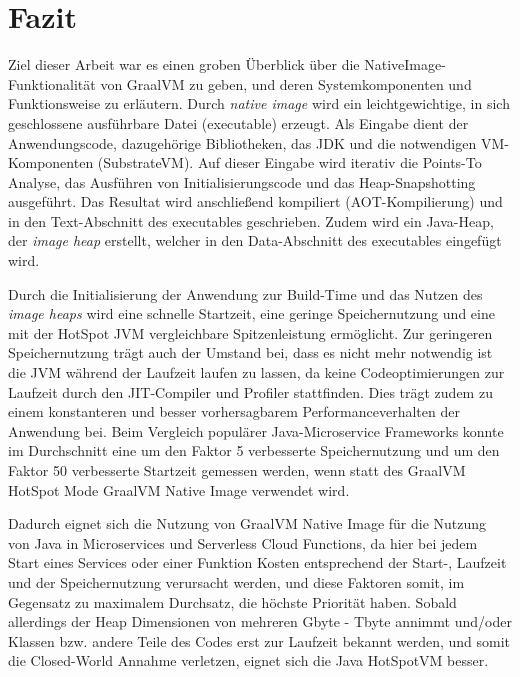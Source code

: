 \section{Fazit}
\label{sec:fazit}

Ziel dieser Arbeit war es einen groben Überblick über die NativeImage-Funktionalität von GraalVM zu geben, und deren Systemkomponenten und Funktionsweise zu erläutern. 
Durch \textit{native image} wird ein leichtgewichtige, in sich geschlossene ausführbare Datei (executable) erzeugt. Als Eingabe dient der Anwendungscode, dazugehörige Bibliotheken, das JDK und 
die notwendigen VM-Komponenten (SubstrateVM). Auf dieser Eingabe wird iterativ die Points-To Analyse, das Ausführen
von Initialisierungscode und das Heap-Snapshotting ausgeführt. Das Resultat wird anschließend kompiliert (AOT-Kompilierung) und in den Text-Abschnitt des executables geschrieben. Zudem wird ein Java-Heap, der \textit{image heap}
erstellt, welcher in den Data-Abschnitt des executables eingefügt wird. 

Durch die Initialisierung der Anwendung zur Build-Time und das Nutzen des \textit{image heaps} wird eine schnelle Startzeit, eine geringe Speichernutzung und eine mit der HotSpot JVM vergleichbare Spitzenleistung
ermöglicht.  Zur geringeren Speichernutzung trägt auch der Umstand bei, dass es nicht mehr notwendig ist die JVM während der Laufzeit laufen zu lassen,
 da keine Codeoptimierungen zur Laufzeit durch den JIT-Compiler und Profiler stattfinden. Dies trägt zudem zu einem konstanteren und besser vorhersagbarem Performanceverhalten der Anwendung bei.
 Beim Vergleich populärer Java-Microservice Frameworks konnte im Durchschnitt eine um den Faktor 5 verbesserte Speichernutzung
und um den Faktor 50 verbesserte Startzeit gemessen werden, wenn statt des GraalVM HotSpot Mode GraalVM Native Image verwendet wird.

Dadurch eignet sich die Nutzung von GraalVM Native Image für die Nutzung von Java in Microservices und Serverless Cloud Functions, da hier bei jedem Start eines Services oder einer Funktion 
Kosten entsprechend der Start-, Laufzeit und der Speichernutzung verursacht werden, und diese Faktoren somit, im Gegensatz zu maximalem Durchsatz, die höchste Priorität haben. 
Sobald allerdings der Heap Dimensionen von mehreren Gbyte - Tbyte annimmt und/oder Klassen bzw. andere Teile des Codes erst zur Laufzeit bekannt werden, und somit die Closed-World Annahme verletzen,
 eignet sich die Java HotSpotVM besser. 
